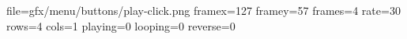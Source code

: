 file=gfx/menu/buttons/play-click.png
framex=127
framey=57
frames=4
rate=30
rows=4
cols=1
playing=0
looping=0
reverse=0